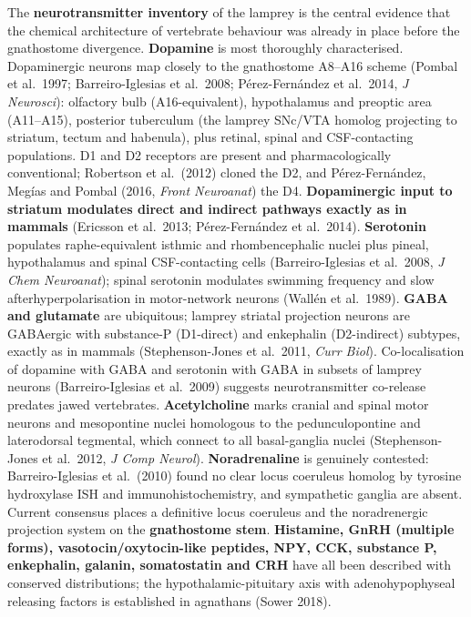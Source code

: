 The \textbf{neurotransmitter inventory} of the lamprey is the central evidence that the chemical architecture of vertebrate behaviour was already in place before the gnathostome divergence. \textbf{Dopamine} is most thoroughly characterised. Dopaminergic neurons map closely to the gnathostome A8--A16 scheme (Pombal et al.~1997; Barreiro-Iglesias et al.~2008; Pérez-Fernández et al.~2014, \emph{J Neurosci}): olfactory bulb (A16-equivalent), hypothalamus and preoptic area (A11--A15), posterior tuberculum (the lamprey SNc/VTA homolog projecting to striatum, tectum and habenula), plus retinal, spinal and CSF-contacting populations. D1 and D2 receptors are present and pharmacologically conventional; Robertson et al.~(2012) cloned the D2, and Pérez-Fernández, Megías and Pombal (2016, \emph{Front Neuroanat}) the D4. \textbf{Dopaminergic input to striatum modulates direct and indirect pathways exactly as in mammals} (Ericsson et al.~2013; Pérez-Fernández et al.~2014). \textbf{Serotonin} populates raphe-equivalent isthmic and rhombencephalic nuclei plus pineal, hypothalamus and spinal CSF-contacting cells (Barreiro-Iglesias et al.~2008, \emph{J Chem Neuroanat}); spinal serotonin modulates swimming frequency and slow afterhyperpolarisation in motor-network neurons (Wallén et al.~1989). \textbf{GABA and glutamate} are ubiquitous; lamprey striatal projection neurons are GABAergic with substance-P (D1-direct) and enkephalin (D2-indirect) subtypes, exactly as in mammals (Stephenson-Jones et al.~2011, \emph{Curr Biol}). Co-localisation of dopamine with GABA and serotonin with GABA in subsets of lamprey neurons (Barreiro-Iglesias et al.~2009) suggests neurotransmitter co-release predates jawed vertebrates. \textbf{Acetylcholine} marks cranial and spinal motor neurons and mesopontine nuclei homologous to the pedunculopontine and laterodorsal tegmental, which connect to all basal-ganglia nuclei (Stephenson-Jones et al.~2012, \emph{J Comp Neurol}). \textbf{Noradrenaline} is genuinely contested: Barreiro-Iglesias et al.~(2010) found no clear locus coeruleus homolog by tyrosine hydroxylase ISH and immunohistochemistry, and sympathetic ganglia are absent. Current consensus places a definitive locus coeruleus and the noradrenergic projection system on the \textbf{gnathostome stem}. \textbf{Histamine, GnRH (multiple forms), vasotocin/oxytocin-like peptides, NPY, CCK, substance P, enkephalin, galanin, somatostatin and CRH} have all been described with conserved distributions; the hypothalamic-pituitary axis with adenohypophyseal releasing factors is established in agnathans (Sower 2018).

